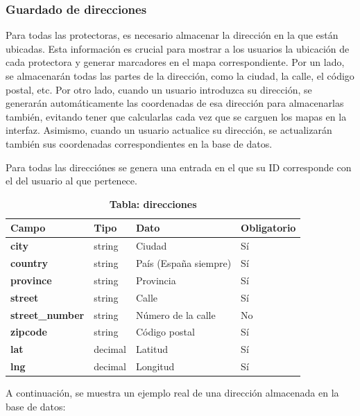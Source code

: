 \documentclass[a4paper, 12pt]{article}
\begin{document}
\subsubsection{Guardado de direcciones}

Para todas las protectoras, es necesario almacenar la dirección en la que están ubicadas. Esta información es crucial para mostrar a los usuarios la ubicación de cada protectora y generar marcadores en el mapa correspondiente. Por un lado, se almacenarán todas las partes de la dirección, como la ciudad, la calle, el código postal, etc. Por otro lado, cuando un usuario introduzca su dirección, se generarán automáticamente las coordenadas de esa dirección para almacenarlas también, evitando tener que calcularlas cada vez que se carguen los mapas en la interfaz. Asimismo, cuando un usuario actualice su dirección, se actualizarán también sus coordenadas correspondientes en la base de datos.

Para todas las direcciónes se genera una entrada en el que su ID corresponde con el del usuario al que pertenece.

\begin{table}[H]
\captionsetup{justification=raggedright,singlelinecheck=false}
\captionsetup{labelformat=empty}
\caption{\textbf{Tabla: direcciones}}
\label{tab:Addresses}
	\begin{tabular}{|m{3cm}|m{2cm}|m{5cm}|m{3cm}|}
	\hline
	\textbf{Campo} & \textbf{Tipo} & \textbf{Dato} & \textbf{Obligatorio} \\ 
	\hline
	\textbf{city} & string & Ciudad & Sí \\ 
	\hline
	\textbf{country} & string & País (España siempre) & Sí \\ 
	\hline
	\textbf{province} &  string & Provincia & Sí \\ 
	\hline
	\textbf{street} &  string & Calle &  Sí \\ 
	\hline
	\textbf{street\_number} &  string & Número de la calle & No\\ 
	\hline
	\textbf{zipcode} & string & Código postal &  Sí \\ 
	\hline
	\textbf{lat} & decimal & Latitud & Sí \\ 
	\hline
	\textbf{lng} & decimal & Longitud &  Sí \\ 
	\hline
\end{tabular}
\end{table}

A continuación, se muestra un ejemplo real de una dirección almacenada en la base de datos:
\end{document}
